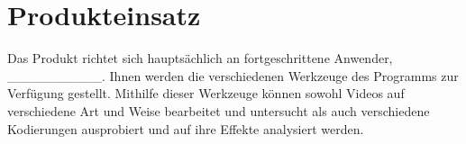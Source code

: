 \section{Produkteinsatz}

Das Produkt richtet sich hauptsächlich an fortgeschrittene Anwender, __________. Ihnen werden die verschiedenen Werkzeuge des Programms zur Verfügung gestellt. Mithilfe dieser Werkzeuge können sowohl Videos auf verschiedene Art und Weise bearbeitet und untersucht als auch verschiedene Kodierungen ausprobiert und auf ihre Effekte analysiert werden.
